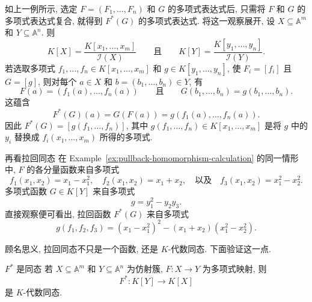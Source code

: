 如上一例所示, 选定 $F=(F_{1},\ldots,F_{n})$ 和 $G$ 的多项式表达式后, 只需将 $F$ 和 $G$ 的多项式表达式复合, 就得到 $F^{*}(G)$ 的多项式表达式. 将这一观察展开, 设 $X\subseteq\mathbb{A}^{m}$ 和 $Y\subseteq\mathbb{A}^{n}$. 则
\[
  K[X]=\frac{K[x_{1},\ldots,x_{m}]}{\mathcal{I}(X)}
  \qquad\text{且}\qquad
  K[Y]=\frac{K[y_{1},\ldots,y_{n}]}{\mathcal{I}(Y)}.
\]
若选取多项式 $f_{1},\ldots,f_{n}\in K[x_{1},\ldots,x_{m}]$ 和 $g\in K[y_{1},\ldots,y_{n}]$, 使 $F_{i}=[f_{i}]$ 且 $G=[g]$, 则对每个 $a\in X$ 和 $b=(b_{1},\ldots,b_{n})\in Y$, 有
\[
  F(a)=(f_{1}(a),\ldots,f_{n}(a))
  \qquad\text{且}\qquad
  G(b_{1},\ldots,b_{n})=g(b_{1},\ldots,b_{n}).
\]
这蕴含
\[
  F^{*}(G)(a)=G(F(a))=g(f_{1}(a),\ldots,f_{n}(a)).
\]
因此 $F^{*}(G)=[g(f_{1},\ldots,f_{n})]$, 其中 $g(f_{1},\ldots,f_{n})\in K[x_{1},\ldots,x_{m}]$ 是将 $g$ 中的 $y_{i}$ 替换成 $f_{i}(x_{1},\ldots,x_{m})$ 所得的多项式.

\begin{Example}{再看拉回同态}\leavevmode\label{ex:pullback-by-polynomial-substitution}
  在 Example~\ref{ex:pullback-homomorphism-calculation} 的同一情形中, $F$ 的各分量函数来自多项式
  \[
    f_{1}(x_{1},x_{2})=x_{1}-x_{1}^{2},\quad f_{2}(x_{1},x_{2})=x_{1}+x_{2},\quad
    \text{以及}\quad f_{3}(x_{1},x_{2})=x_{1}^{2}-x_{2}^{2}.
  \]
  多项式函数 $G\in K[Y]$ 来自多项式
  \[
    g=y_{1}^{2}-y_{2}y_{3}.
  \]
  直接观察便可看出, 拉回函数 $F^{*}(G)$ 来自多项式
  \[
    g(f_{1},f_{2},f_{3})=(x_{1}-x_{1}^{2})^{2}-(x_{1}+x_{2})(x_{1}^{2}-x_{2}^{2}).
  \]
\end{Example}

顾名思义, 拉回同态不只是一个函数, 还是 $K$-代数同态. 下面验证这一点.

\begin{Proposition}{$F^{*}$ 是同态}\leavevmode\label{prop:pullback-is-homomorphism}
  若 $X\subseteq\mathbb{A}^{m}$ 和 $Y\subseteq\mathbb{A}^{n}$ 为仿射簇, $F:X\to Y$ 为多项式映射, 则
  \[
    F^{*}:K[Y]\to K[X]
  \]
  是 $K$-代数同态.
\end{Proposition}

